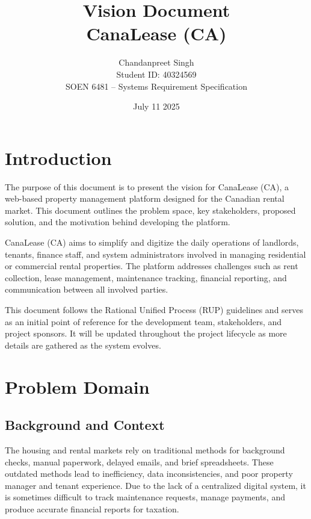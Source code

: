 \documentclass[12pt]{article}
\title{Vision Document\\\large CanaLease (CA)}
\author{Chandanpreet Singh \\ Student ID: 40324569 \\ SOEN 6481 -- Systems Requirement Specification}
\date{July 11 2025 }
\begin{document}
\maketitle
\tableofcontents
\newpage

\section{Introduction}
The purpose of this document is to present the vision for CanaLease (CA), a web-based property management platform designed for the Canadian rental market. This document outlines the problem space, key stakeholders, proposed solution, and the motivation behind developing the platform.

CanaLease (CA) aims to simplify and digitize the daily operations of landlords, tenants, finance staff, and system administrators involved in managing residential or commercial rental properties. The platform addresses challenges such as rent collection, lease management, maintenance tracking, financial reporting, and communication between all involved parties.

This document follows the Rational Unified Process (RUP) guidelines and serves as an initial point of reference for the development team, stakeholders, and project sponsors. It will be updated throughout the project lifecycle as more details are gathered as the system evolves.


\section{Problem Domain}

\subsection{Background and Context}
The housing and rental markets rely on traditional methods for background checks, manual paperwork, delayed emails, and brief spreadsheets. These outdated methods lead to inefficiency, data inconsistencies, and poor property manager and tenant experience. Due to the lack of a centralized digital system, it is sometimes difficult to track maintenance requests, manage payments, and produce accurate financial reports for taxation.   
\end{document}
